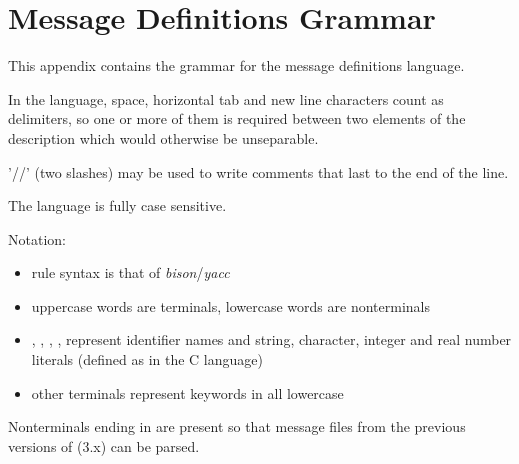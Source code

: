 \chapter{Message Definitions Grammar}
\label{cha:msg-language-grammar}

This appendix contains the grammar for the message definitions
language.

In the language, space, horizontal tab and new line characters count
as delimiters, so one or more of them is required between two elements of the
description which would otherwise be unseparable.

'//' (two slashes) may be used to write comments that last to the end of the line.

The language is fully case sensitive.

Notation:
\begin{itemize}
  \item{rule syntax is that of \textit{bison}/\textit{yacc}}
  \item{uppercase words are terminals, lowercase words are nonterminals}
  \item{, , , ,
         represent identifier names and string, character,
        integer and real number literals (defined as in the C language)}
  \item{other terminals represent keywords in all lowercase}
\end{itemize}

Nonterminals ending in  are present so that message files
from the previous versions of {\opp} (3.x) can be parsed.

%
%
%

